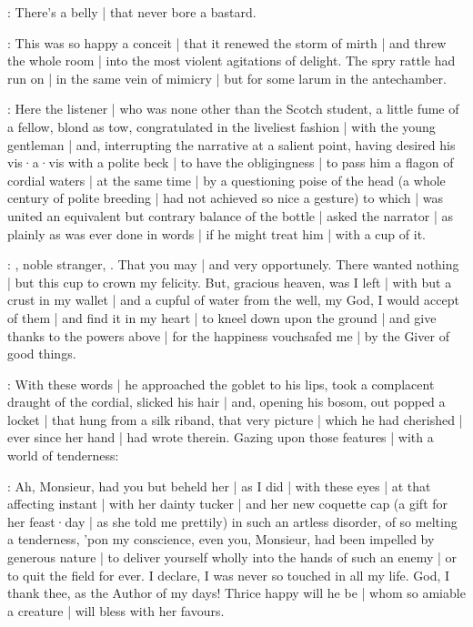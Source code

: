 \mulligan:
There's a belly |
that never bore a bastard.

:
This was so happy a conceit |
that it renewed the storm of mirth |
and threw the whole room |
into the most violent agitations of delight.
The spry rattle had run on |
in the same vein of mimicry |
but for some larum in the antechamber.



:
Here the listener |
who was none other than the Scotch student,
a little fume of a fellow,
blond as tow,
congratulated in the liveliest fashion |
with the young gentleman |
and,
interrupting the narrative at a salient point,
having desired his vis·a·vis with a polite beck |
to have the obligingness |
to pass him a flagon of cordial waters |
at the same time |
by a questioning poise of the head
(a whole century of polite breeding |
had not achieved so nice a gesture)
to which |
was united an equivalent but contrary balance of the bottle |
asked the narrator |
as plainly as was ever done in words |
if he might treat him |
with a cup of it.

\bannon:
,
noble stranger,
.
That you may |
and very opportunely.
There wanted nothing |
but this cup to crown my felicity.
But,
gracious heaven,
was I left |
with but a crust in my wallet |
and a cupful of water from the well,
my God,
I would accept of them |
and find it in my heart |
to kneel down upon the ground |
and give thanks to the powers above |
for the happiness vouchsafed me |
by the Giver of good things.

:
With these words |
he approached the goblet to his lips,
took a complacent draught of the cordial,
slicked his hair |
and,
opening his bosom,
out popped a locket |
that hung from a silk riband,
that very picture |
which he had cherished |
ever since her hand |
had wrote therein.
Gazing upon those features |
with a world of tenderness:

\bannon:
Ah,
Monsieur,
had you but beheld her |
as I did |
with these eyes |
at that affecting instant |
with her dainty tucker |
and her new coquette cap
(a gift for her feast·day |
as she told me prettily)
in such an artless disorder,
of so melting a tenderness,
'pon my conscience,
even you,
Monsieur,
had been impelled by generous nature |
to deliver yourself wholly into the hands of such an enemy |
or to quit the field for ever.
I declare,
I was never so touched in all my life.
God,
I thank thee,
as the Author of my days!
Thrice happy will he be |
whom so amiable a creature |
will bless with her favours.

